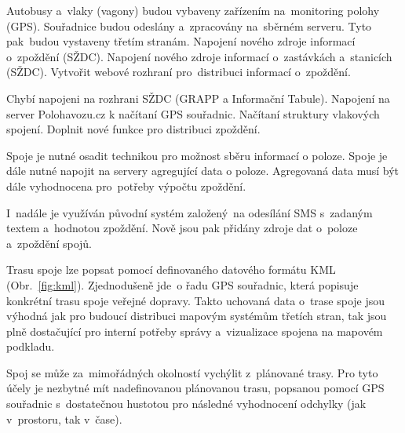 
Autobusy a~vlaky (vagony) budou vybaveny zařízením na~monitoring polohy (GPS).
Souřadnice budou odeslány a~zpracovány na~sběrném serveru. Tyto pak~budou vystaveny třetím stranám.
Napojení nového zdroje informací o~zpoždění (SŽDC). Napojení nového zdroje informací o~zastávkách a~stanicích (SŽDC). Vytvořit webové rozhraní pro~distribuci informací o~zpoždění.


Chybí napojeni na rozhrani SŽDC (GRAPP a Informační Tabule). Napojení na server Polohavozu.cz k načítaní GPS souřadnic. Načítaní struktury vlakových spojení. Doplnit nové funkce pro distribuci zpoždění.

Spoje je nutné osadit technikou pro možnost sběru informací o poloze. Spoje je dále nutné napojit na servery agregující data o poloze. Agregovaná data musí být dále vyhodnocena pro~potřeby výpočtu zpoždění.

I~nadále je využíván původní systém založený~na odesílání SMS s~zadaným textem a~hodnotou zpoždění. Nově jsou pak přidány zdroje dat o~poloze a~zpoždění spojů.


Trasu spoje lze popsat pomocí definovaného datového formátu KML (Obr.~\ref{fig:kml}). Zjednodušeně jde~o řadu GPS souřadnic, která popisuje konkrétní trasu spoje veřejné dopravy. Takto uchovaná data o~trase spoje jsou výhodná jak pro budoucí distribuci mapovým systémům třetích stran, tak jsou plně dostačující pro interní potřeby správy a~vizualizace spojena na mapovém podkladu.


Spoj se může za~mimořádných okolností vychýlit z~plánované trasy. Pro tyto účely je nezbytné mít nadefinovanou plánovanou trasu, popsanou pomocí GPS souřadnic s~dostatečnou hustotou pro následné vyhodnocení odchylky (jak v~prostoru, tak v~čase).


